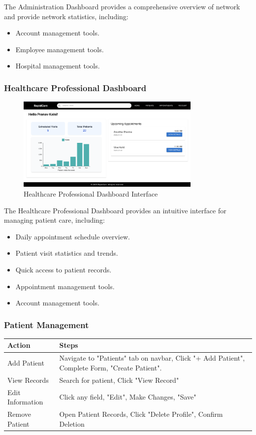 \documentclass[12pt, titlepage]{article}
\begin{document}
The Administration Dashboard provides a comprehensive overview of network and provide network statistics, including:
\begin{itemize}
\item Account management tools.
\item Employee management tools.
\item Hospital management tools.
\end{itemize}

\subsubsection{Healthcare Professional Dashboard}
\begin{figure}[H]
\centering
\includegraphics[width=0.8\textwidth]{healthcare.png}
\caption{Healthcare Professional Dashboard Interface}
\label{fig:healthcare_dashboard}
\end{figure}

The Healthcare Professional Dashboard provides an intuitive interface for managing patient care, including:
\begin{itemize}
\item Daily appointment schedule overview.
\item Patient visit statistics and trends.
\item Quick access to patient records.
\item Appointment management tools.
\item Account management tools.
\end{itemize}

\subsubsection{Patient Management}
\begin{longtable}{p{}p{}}
\toprule
\textbf{Action} & \textbf{Steps} \\
\midrule
Add Patient & Navigate to "Patients" tab on navbar, Click "+ Add Patient", Complete Form, "Create Patient". \\
View Records & Search for patient, Click "View Record" \\
Edit Information & Click any field, "Edit", Make Changes, "Save" \\
Remove Patient & Open Patient Records, Click "Delete Profile", Confirm Deletion \\
\bottomrule
\end{longtable}
\end{document}
